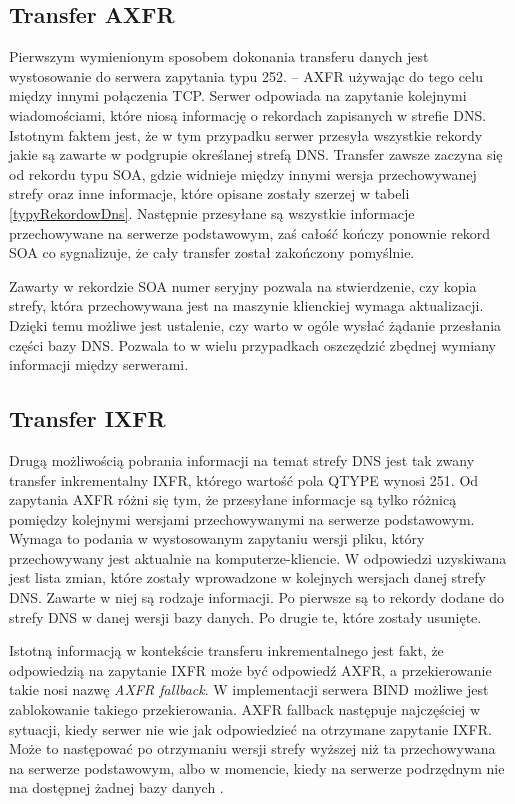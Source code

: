 \subsection{Transfer AXFR}
\noindent Pierwszym wymienionym sposobem dokonania transferu danych jest wystosowanie do serwera zapytania typu 252. -- AXFR \cite{RFC5936}
używając do tego celu między innymi połączenia TCP. Serwer odpowiada na zapytanie kolejnymi wiadomościami, które niosą informację o
rekordach zapisanych w strefie DNS. Istotnym faktem jest, że w tym przypadku serwer przesyła wszystkie rekordy jakie są zawarte w
podgrupie określanej strefą DNS. Transfer zawsze zaczyna się od rekordu typu SOA, gdzie widnieje między innymi wersja przechowywanej
strefy oraz inne informacje, które opisane zostały szerzej w tabeli \ref{typyRekordowDns}. Następnie przesyłane są wszystkie informacje
przechowywane na serwerze podstawowym, zaś całość kończy ponownie rekord SOA co sygnalizuje, że cały transfer został zakończony pomyślnie.

Zawarty w rekordzie SOA numer seryjny pozwala na stwierdzenie, czy kopia strefy, która przechowywana jest na maszynie klienckiej
wymaga aktualizacji. Dzięki temu możliwe jest ustalenie, czy warto w ogóle wysłać żądanie przesłania części bazy DNS. Pozwala to
w wielu przypadkach oszczędzić zbędnej wymiany informacji między serwerami.

\subsection{Transfer IXFR}
\noindent Drugą możliwością pobrania informacji na temat strefy DNS jest tak zwany transfer inkrementalny IXFR, którego wartość pola QTYPE
wynosi 251. Od zapytania AXFR różni się tym, że przesyłane informacje są tylko różnicą pomiędzy kolejnymi wersjami przechowywanymi
na serwerze podstawowym. Wymaga to podania w wystosowanym zapytaniu wersji pliku, który przechowywany jest aktualnie na
komputerze-kliencie. W odpowiedzi uzyskiwana jest lista zmian, które zostały wprowadzone w kolejnych wersjach danej strefy DNS.
Zawarte w niej są rodzaje informacji. Po pierwsze są to rekordy dodane do strefy DNS w danej wersji bazy danych.
Po drugie te, które zostały usunięte.

Istotną informacją w kontekście transferu inkrementalnego jest fakt, że odpowiedzią na zapytanie IXFR może być odpowiedź AXFR, a
przekierowanie takie nosi nazwę \textit{AXFR fallback}. W implementacji serwera BIND \cite{isc} możliwe jest zablokowanie takiego
przekierowania. AXFR fallback następuje najczęściej w sytuacji, kiedy serwer nie wie jak odpowiedzieć na otrzymane zapytanie IXFR.
Może to następować po otrzymaniu wersji strefy wyższej niż ta przechowywana na serwerze podstawowym, albo w momencie, kiedy na
serwerze podrzędnym nie ma dostępnej żadnej bazy danych \cite{I-D.song-dnsop-ixfr-fallback}.

